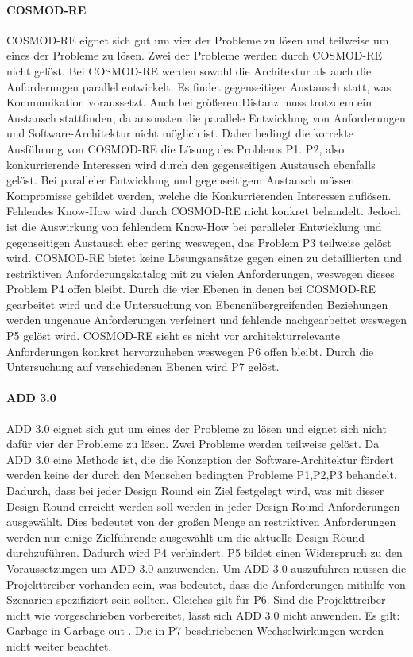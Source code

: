 \paragraph{COSMOD-RE}
COSMOD-RE eignet sich gut um vier der Probleme zu lösen und teilweise um eines der Probleme zu lösen. Zwei der Probleme werden durch COSMOD-RE nicht gelöst. Bei COSMOD-RE werden sowohl die Architektur als auch die Anforderungen parallel entwickelt. Es findet gegenseitiger Austausch statt, was Kommunikation voraussetzt. Auch bei größeren Distanz muss trotzdem ein Austausch stattfinden, da ansonsten die parallele Entwicklung von Anforderungen und Software-Architektur nicht möglich ist. Daher bedingt die korrekte Ausführung von COSMOD-RE die Lösung des Problems P1. P2, also konkurrierende Interessen wird durch den gegenseitigen Austausch ebenfalls gelöst. Bei paralleler Entwicklung und gegenseitigem Austausch müssen Kompromisse gebildet werden, welche die Konkurrierenden Interessen auflösen. Fehlendes Know-How wird durch COSMOD-RE nicht konkret behandelt. Jedoch ist die Auswirkung von fehlendem Know-How bei paralleler Entwicklung und gegenseitigen Austausch eher gering weswegen, das Problem P3 teilweise gelöst wird. COSMOD-RE bietet keine Lösungsansätze gegen einen zu detaillierten und restriktiven Anforderungskatalog mit zu vielen Anforderungen, weswegen dieses Problem P4 offen bleibt. Durch die vier Ebenen in denen bei COSMOD-RE gearbeitet wird und die Untersuchung von Ebenenübergreifenden Beziehungen werden ungenaue Anforderungen verfeinert und fehlende nachgearbeitet weswegen P5 gelöst wird. COSMOD-RE sieht es nicht vor architekturrelevante Anforderungen konkret hervorzuheben weswegen P6 offen bleibt. Durch die Untersuchung auf verschiedenen Ebenen wird P7 gelöst.\\

\paragraph{ADD 3.0}
ADD 3.0 eignet sich gut um eines der Probleme zu lösen und eignet sich nicht dafür vier der Probleme zu lösen. Zwei Probleme werden teilweise gelöst. Da ADD 3.0 eine Methode ist, die die Konzeption der Software-Architektur fördert werden keine der durch den Menschen bedingten Probleme P1,P2,P3 behandelt. Dadurch, dass bei jeder Design Round ein Ziel festgelegt wird, was mit dieser Design Round erreicht werden soll werden in jeder Design Round Anforderungen ausgewählt. Dies bedeutet von der großen Menge an restriktiven Anforderungen werden nur einige Zielführende ausgewählt um die aktuelle Design Round durchzuführen. Dadurch wird P4 verhindert. P5 bildet einen Widerspruch zu den Voraussetzungen um ADD 3.0 anzuwenden. Um ADD 3.0 auszuführen müssen die Projekttreiber vorhanden sein, was bedeutet, dass die Anforderungen mithilfe von Szenarien spezifiziert sein sollten. Gleiches gilt für P6. Sind die Projekttreiber nicht wie vorgeschrieben vorbereitet, lässt sich ADD 3.0 nicht anwenden. Es gilt: Garbage in Garbage out \cite{Cer01}. Die in P7 beschriebenen Wechselwirkungen werden nicht weiter beachtet.\\

